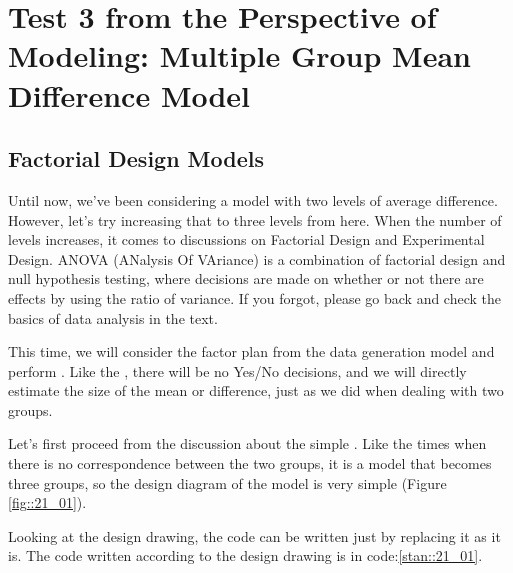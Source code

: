 \documentclass{ltjsbook}
\begin{document}
\VerbatimFootnotes
\chapter{Test 3 from the Perspective of Modeling: Multiple Group Mean Difference Model}
\label{x21_modeling3}
\section{Factorial Design Models}
Until now, we've been considering a model with two levels of average difference. However, let's try increasing that to three levels from here.
When the number of levels increases, it comes to discussions on Factorial Design and Experimental Design. ANOVA (ANalysis Of VAriance) is a combination of factorial design and null hypothesis testing, where decisions are made on whether or not there are effects by using the ratio of variance. If you forgot, please go back and check the basics of data analysis in the text.

This time, we will consider the factor plan from the data generation model and perform . Like the , there will be no Yes/No decisions, and we will directly estimate the size of the mean or difference, just as we did when dealing with two groups.

Let's first proceed from the discussion about the simple . Like the times when there is no correspondence between the two groups, it is a model that becomes three groups, so the design diagram of the model is very simple (Figure \ref{fig::21_01}).

Looking at the design drawing, the code can be written just by replacing it as it is. The code written according to the design drawing is in code:\ref{stan::21_01}.
\end{document}
